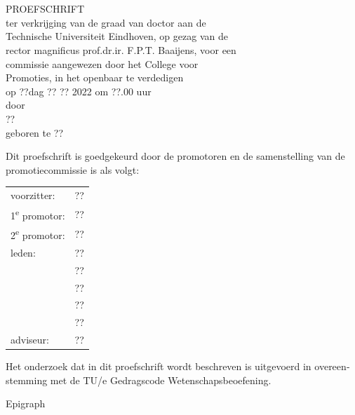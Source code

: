 \newpage
\thispagestyle{empty}
\begin{otherlanguage}{dutch}

\vspace*{\fill}

\begin{center}
\iftuefont
\huge{\tuefontscala\selectfont \maintitle}\\[30mm]
\else
\huge{\sffamily\selectfont \maintitle}\\[30mm]
\fi
\normalsize {PROEFSCHRIFT}\\[8mm]
ter verkrijging van de graad van doctor aan de\\
Technische Universiteit Eindhoven, op gezag van de\\
rector magnificus prof.dr.ir. F.P.T. Baaijens, voor een\\
commissie aangewezen door het College voor\\
Promoties, in het openbaar te verdedigen\\
op ??dag ?? ?? 2022 om ??.00 uur\\[8mm]
door\\[8mm]
??\\[8mm]
geboren te ??
\end{center}

\vspace*{\fill}


\newpage
\thispagestyle{empty}
Dit proefschrift is goedgekeurd door de promotoren en de samenstelling van de promotiecommissie is als volgt:\\[\baselineskip]
\begin{tabular}{@{}ll}
voorzitter:	& ??\\
1\textsuperscript{e} promotor:	& ??\\
2\textsuperscript{e} promotor:	& ??\\
leden:		& ??\\
			& ??\\
			& ??\\
			& ??\\
			& ??\\
adviseur:	& ??
\end{tabular}

\vspace*{\fill}

\begin{flushleft}
Het onderzoek dat in dit proefschrift wordt beschreven is uitgevoerd in overeenstemming met de TU/e Gedragscode Wetenschapsbeoefening.
\end{flushleft}

\end{otherlanguage}

\clearpage
\thispagestyle{empty}

\vspace*{\fill}

\begin{center}
  Epigraph
\end{center}

\vspace*{\fill}

\endgroup
